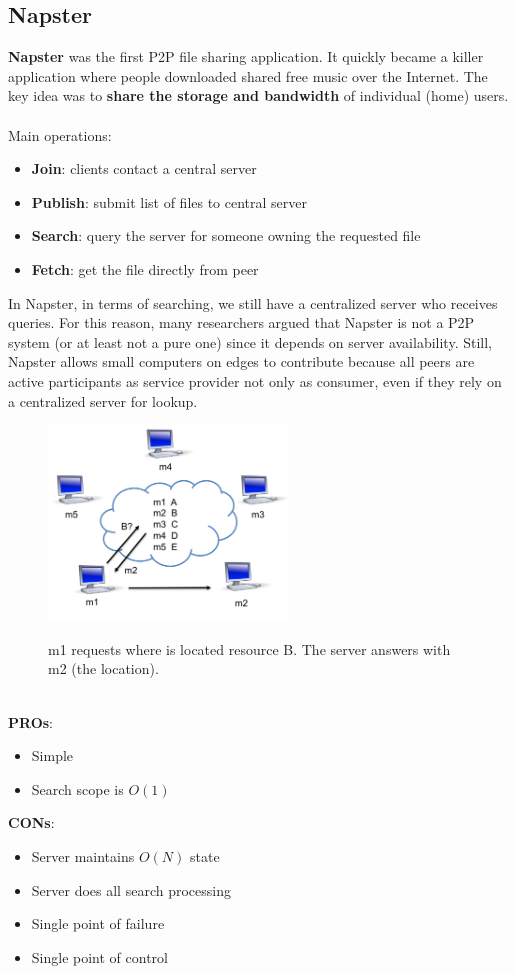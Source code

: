 \documentclass[10pt,a4paper]{article}
\begin{document}
\subsection{Napster}
\textbf{Napster} was the first P2P file sharing application. It quickly became a killer application where people downloaded shared free music over the Internet. The key idea was to \textbf{share the storage and bandwidth} of individual (home) users. \\ \\
Main operations:
\begin{itemize}
	\item \textbf{Join}: clients contact a central server
	\item \textbf{Publish}: submit list of files to central server
	\item \textbf{Search}: query the server for someone owning the requested file
	\item \textbf{Fetch}: get the file directly from peer
\end{itemize}
In Napster, in terms of searching, we still have a centralized server who receives queries.
For this reason, many researchers argued that Napster is not a P2P system (or at least not a pure one) since it depends on server availability. Still, Napster allows small computers on edges to contribute because all peers are active participants as service provider not only as consumer, even if they rely on a centralized server for lookup.
\begin{figure}[h!]
\hfill \includegraphics[width=180pt]{images/napster.png}\hspace*{\fill}
  \label{fig:napster}
  \caption{m1 requests where is located resource B. The server answers with m2 (the location). }
\end{figure}  \\
\textbf{PROs}:
\begin{itemize}
	\item Simple
	\item Search scope is $O(1)$
\end{itemize}
\textbf{CONs}:
\begin{itemize}
	\item Server maintains $O(N)$ state
	\item Server does all search processing
	\item Single point of failure
	\item Single point of control
\end{itemize}
\end{document}
